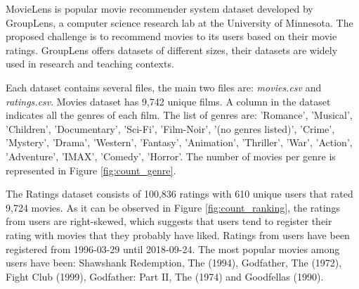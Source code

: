 \documentclass[12pt]{article}
\numberwithin{equation}{section}
\begin{document}
MovieLens is popular movie recommender system dataset developed by GroupLens, a computer science research lab at the University of Minnesota. The proposed challenge is to recommend movies to its users based on their movie ratings. GroupLens offers datasets of different sizes, their datasets are widely used in research and teaching contexts.

Each dataset contains several files, the main two files are: \textit{movies.csv} and \textit{ratings.csv}. Movies dataset has 9,742 unique films. A column in the dataset indicates all the genres of each film. The list of genres are: 'Romance', 'Musical', 'Children', 'Documentary', 'Sci-Fi', 'Film-Noir', '(no genres listed)', 'Crime', 'Mystery', 'Drama', 'Western', 'Fantasy', 'Animation', 'Thriller', 'War', 'Action', 'Adventure', 'IMAX', 'Comedy', 'Horror'. The number of movies per genre is represented in Figure \ref{fig:count_genre}.

The Ratings dataset consists of 100,836 ratings with 610 unique users that rated 9,724 movies. As it can be observed in Figure \ref{fig:count_ranking}, the ratings from users are right-skewed, which suggests that users tend to register their rating with movies that they probably have liked. Ratings from users have been registered from 1996-03-29 until 2018-09-24. The most popular movies among users have been: Shawshank Redemption, The (1994), Godfather, The (1972), Fight Club (1999), Godfather: Part II, The (1974) and Goodfellas (1990).
\end{document}
